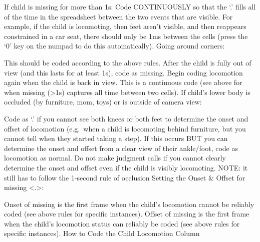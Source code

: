 \documentclass[
]{book}
\begin{document}
If child is missing for more than 1s:
Code CONTINUOUSLY so that the `.' fills all of the time in the spreadsheet between the two events that are visible. For example, if the child is locomoting, then feet aren't visible, and then reappears constrained in a car seat, there should only be 1ms between the cells (press the `0' key on the numpad to do this automatically).
Going around corners:

This should be coded according to the above rules. After the child is fully out of view (and this lasts for at least 1s), code as missing. Begin coding locomotion again when the child is back in view. This is a continuous code (see above for when missing (\textgreater1s) captures all time between two cells).
If child's lower body is occluded (by furniture, mom, toys) or is outside of camera view:

Code as `.' if you cannot see both knees or both feet to determine the onset and offset of locomotion (e.g.~when a child is locomoting behind furniture, but you cannot tell when they started taking a step). If this occurs BUT you can determine the onset and offset from a clear view of their ankle/foot, code as locomotion as normal. Do not make judgment calls if you cannot clearly determine the onset and offset even if the child is visibly locomoting. NOTE: it still has to follow the 1-second rule of occlusion
Setting the Onset \& Offset for missing \textless.\textgreater:

Onset of missing is the first frame when the child's locomotion cannot be reliably coded (see above rules for specific instances).
Offset of missing is the first frame when the child's locomotion status can reliably be coded (see above rules for specific instances).
How to Code the Child Locomotion Column
\end{document}
